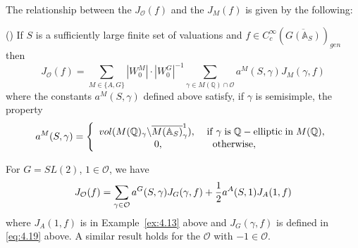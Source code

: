 The relationship between the $J_{{\mathcal O}}(f)$ and the
$J_M(f)$ is given by the following:

\begin{proposition}\label{prop:4.15}
(\cite[Theorem 8.1]{A12}) If $S$ is a sufficiently large finite set of
valuations and
$f\in C_c^\infty (\overline{G({\mathbb {A}}_S)})_{gen}$ then 
\[
J_{{\mathcal O}}(f)=\sum_{M\in \{A,G\}}
|W_0^M|\cdot |W_0^G|^{-1}
\sum_{\gamma \in M({\mathbb {Q}})\cap {\mathcal{O}}}
a^M(S,\gamma )J_M(\gamma ,f) 
\]
where the constants $a^M(S,\gamma )$ defined above
satisfy, if $\gamma $ is semisimple, the property 
\[
a^M(S,\gamma )=\left\{ 
\begin{array}{c}
vol(M({\mathbb {Q}})_\gamma \backslash \overline{M({\mathbb {A}}_S)}_\gamma ^1),
\;\;\;\;{\rm if\;}\gamma \;{\rm is}\;
{\mathbb {Q}}-{\rm elliptic\;in}\;M({\mathbb {Q}}), \\ 
0,\;\;\;\;\;\;\;\;\;\;\;\;\;\;\;\;\;\;{\rm otherwise},\;\;\;\;\;
\end{array}
\right. 
\]
\end{proposition}

\begin{example}\label{ex:4.16} For $G=SL(2)$, $1\in {\mathcal O}$, we have
\[
J_{\mathcal O}(f)=\sum_{\gamma\in {\mathcal{O}}}
a^G(S,\gamma)J_G(\gamma,f)
+{1\over 2}a^A(S,1)J_A(1,f)
\]
where $J_A(1,f)$ is in Example~\ref{ex:4.13} above and $J_G(\gamma,f)$
is defined in \eqref{eq:4.19} above.
A similar result holds for the ${\mathcal{O}}$ with $-1\in {\mathcal{O}}$.
\end{example}


